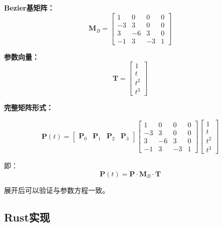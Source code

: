 \documentclass[12pt,a4paper]{article}
\begin{document}
\begin{tcolorbox}[breakable]
\textbf{Bezier基矩阵：}
\begin{equation}
\mathbf{M}_B = \begin{bmatrix}
1 & 0 & 0 & 0 \\
-3 & 3 & 0 & 0 \\
3 & -6 & 3 & 0 \\
-1 & 3 & -3 & 1
\end{bmatrix}
\end{equation}

\textbf{参数向量：}
\begin{equation}
\mathbf{T} = \begin{bmatrix} 1 \\ t \\ t^2 \\ t^3 \end{bmatrix}
\end{equation}

\textbf{完整矩阵形式：}

\begin{equation}
\mathbf{P}(t) = \begin{bmatrix} \mathbf{P}_0 & \mathbf{P}_1 & \mathbf{P}_2 & \mathbf{P}_3 \end{bmatrix} \begin{bmatrix}
1 & 0 & 0 & 0 \\
-3 & 3 & 0 & 0 \\
3 & -6 & 3 & 0 \\
-1 & 3 & -3 & 1
\end{bmatrix} \begin{bmatrix} 1 \\ t \\ t^2 \\ t^3 \end{bmatrix}
\end{equation}

即：
\begin{equation}
\mathbf{P}(t) = \mathbf{P} \cdot \mathbf{M}_B \cdot \mathbf{T}
\end{equation}

展开后可以验证与参数方程一致。
\end{tcolorbox}

\subsection{Rust实现}
\end{document}
